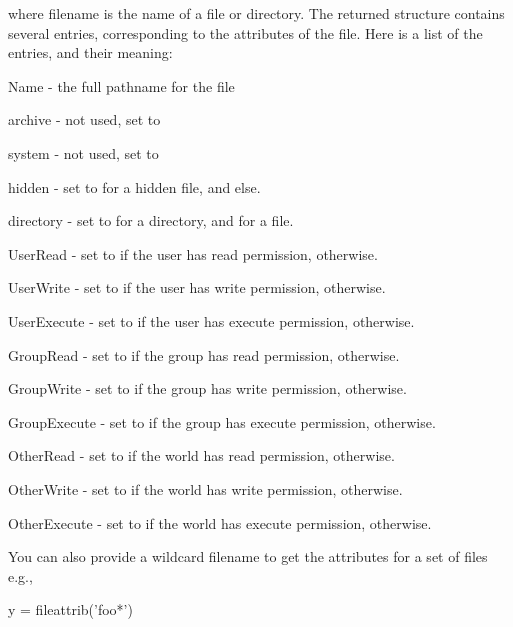  where {\ttfamily filename} is the name of a file or directory. The returned structure contains several entries, corresponding to the attributes of the file. Here is a list of the entries, and their meaning\-: 
\begin{DoxyItemize}
\item {\ttfamily Name} -\/ the full pathname for the file  
\item {\ttfamily archive} -\/ not used, set to {}  
\item {\ttfamily system} -\/ not used, set to {}  
\item {\ttfamily hidden} -\/ set to {} for a hidden file, and {} else.  
\item {\ttfamily directory} -\/ set to {} for a directory, and {} for a file.  
\item {\ttfamily User\-Read} -\/ set to {} if the user has read permission, {} otherwise.  
\item {\ttfamily User\-Write} -\/ set to {} if the user has write permission, {} otherwise.  
\item {\ttfamily User\-Execute} -\/ set to {} if the user has execute permission, {} otherwise.  
\item {\ttfamily Group\-Read} -\/ set to {} if the group has read permission, {} otherwise.  
\item {\ttfamily Group\-Write} -\/ set to {} if the group has write permission, {} otherwise.  
\item {\ttfamily Group\-Execute} -\/ set to {} if the group has execute permission, {} otherwise.  
\item {\ttfamily Other\-Read} -\/ set to {} if the world has read permission, {} otherwise.  
\item {\ttfamily Other\-Write} -\/ set to {} if the world has write permission, {} otherwise.  
\item {\ttfamily Other\-Execute} -\/ set to {} if the world has execute permission, {} otherwise.  
\end{DoxyItemize}You can also provide a wildcard filename to get the attributes for a set of files e.\-g., \begin{DoxyVerb}   y = fileattrib('foo*')
\end{DoxyVerb}


